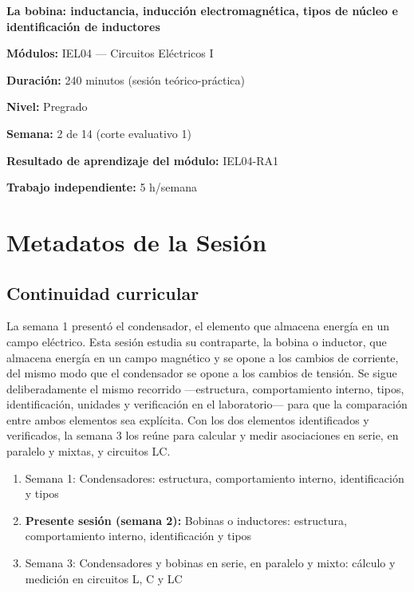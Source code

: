 \documentclass[11pt,letterpaper]{article}
\begin{document}
\begin{cabecera}
{\color{iubyellow}\Large\bfseries La bobina: inductancia, inducción electromagnética, tipos de núcleo e identificación de inductores\par}
\vspace{0.6em}
\small
\textbf{\color{iubyellow}Módulos:} IEL04 --- Circuitos Eléctricos I\par
\textbf{\color{iubyellow}Duración:} 240 minutos (sesión teórico-práctica)\par
\textbf{\color{iubyellow}Nivel:} Pregrado\par
\textbf{\color{iubyellow}Semana:} 2 de 14 (corte evaluativo 1)\par
\textbf{\color{iubyellow}Resultado de aprendizaje del módulo:} IEL04-RA1\par
\textbf{\color{iubyellow}Trabajo independiente:} 5 h/semana\par
\end{cabecera}

\section{Metadatos de la Sesión}

\subsection{Continuidad curricular}

La semana 1 presentó el condensador, el elemento que almacena energía en un campo eléctrico. Esta sesión estudia su contraparte, la bobina o inductor, que almacena energía en un campo magnético y se opone a los cambios de corriente, del mismo modo que el condensador se opone a los cambios de tensión. Se sigue deliberadamente el mismo recorrido ---estructura, comportamiento interno, tipos, identificación, unidades y verificación en el laboratorio--- para que la comparación entre ambos elementos sea explícita. Con los dos elementos identificados y verificados, la semana 3 los reúne para calcular y medir asociaciones en serie, en paralelo y mixtas, y circuitos LC.

\begin{enumerate}
  \item Semana 1: Condensadores: estructura, comportamiento interno, identificación y tipos
  \item \textbf{Presente sesión (semana 2):} Bobinas o inductores: estructura, comportamiento interno, identificación y tipos
  \item Semana 3: Condensadores y bobinas en serie, en paralelo y mixto: cálculo y medición en circuitos L, C y LC
\end{enumerate}
\end{document}
